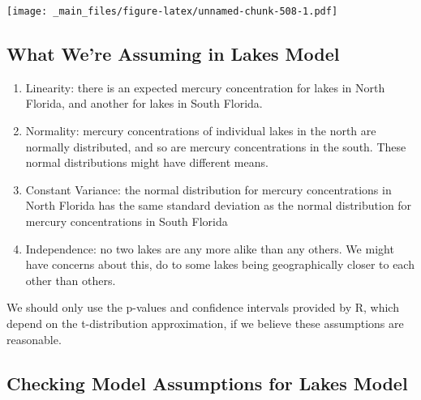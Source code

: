 \documentclass[]{book}
\begin{document}
\texttt{[image: \_main\_files/figure-latex/unnamed-chunk-508-1.pdf]}

\subsection{What We're Assuming in Lakes
Model}\label{what-were-assuming-in-lakes-model}

\begin{enumerate}
\def\labelenumi{\arabic{enumi}.}
\item
  Linearity: there is an expected mercury concentration for lakes in
  North Florida, and another for lakes in South Florida.
\item
  Normality: mercury concentrations of individual lakes in the north are
  normally distributed, and so are mercury concentrations in the south.
  These normal distributions might have different means.
\item
  Constant Variance: the normal distribution for mercury concentrations
  in North Florida has the same standard deviation as the normal
  distribution for mercury concentrations in South Florida
\item
  Independence: no two lakes are any more alike than any others. We
  might have concerns about this, do to some lakes being geographically
  closer to each other than others.
\end{enumerate}

We should only use the p-values and confidence intervals provided by R,
which depend on the t-distribution approximation, if we believe these
assumptions are reasonable.

\subsection{Checking Model Assumptions for Lakes
Model}\label{checking-model-assumptions-for-lakes-model}
\end{document}
